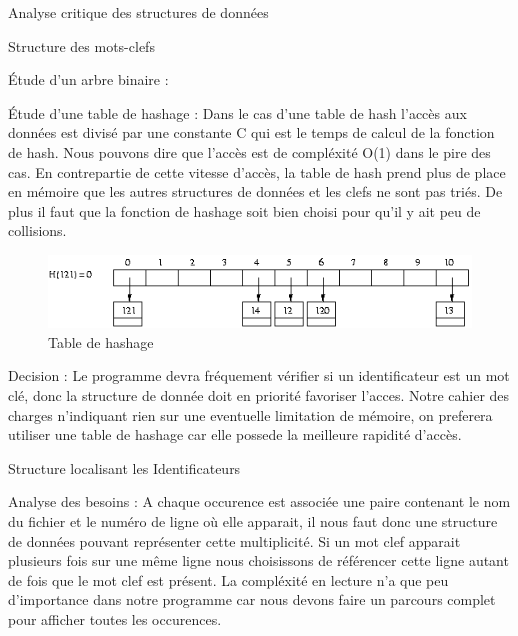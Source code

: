 \documentclass{article}
\begin{document}
\begin{section}{Analyse critique des structures de données}
\begin{subsection}{Structure des mots-clefs}
\begin{paragraph}{Étude d'un arbre binaire :}
    \end{paragraph}
    
    \begin{paragraph}{Étude d'une table de hashage :}
     Dans le cas d'une table de hash l'accès aux données est divisé par une constante C qui est le temps de calcul de la fonction de hash.
     Nous pouvons dire que l'accès est de compléxité O(1) dans le pire des cas. En contrepartie de cette vitesse d'accès, la table de hash
     prend plus de place en mémoire que les autres structures de données et les clefs ne sont pas triés. De plus il faut que la fonction de
     hashage soit bien choisi pour qu'il y ait peu de collisions.
     
    \begin{figure}[htp]
    \centering
    \includegraphics[scale=0.5]{images/hashtable.png}
    \caption{Table de hashage}
    \end{figure}

    \end{paragraph}
    \begin{paragraph}{Decision :}
	Le programme devra fréquement vérifier si un identificateur est un mot clé, donc la structure de donnée doit en priorité favoriser l'acces.
	Notre cahier des charges n'indiquant rien sur une eventuelle limitation de mémoire, on preferera utiliser une table de hashage car elle possede la meilleure rapidité d'accès.
    \end{paragraph}

  \end{subsection}

  \begin{subsection}{Structure localisant les Identificateurs}
    \begin{paragraph}{Analyse des besoins :}
    A chaque occurence est associée une paire contenant le nom du fichier et le numéro de ligne où elle apparait, il nous faut donc une structure de données pouvant représenter
    cette multiplicité. Si un mot clef apparait plusieurs fois sur une même ligne nous choisissons de référencer cette ligne autant de fois que le mot clef est présent.
    La compléxité en lecture n'a que peu d'importance dans notre programme car nous devons faire un parcours complet pour afficher toutes les occurences.
    

\end{paragraph}
\end{subsection}
\end{section}
\end{document}
